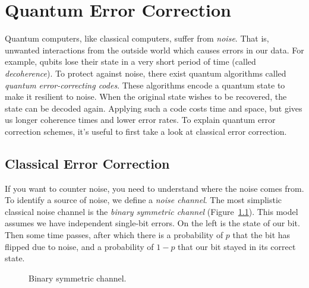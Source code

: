 \chapter{Quantum Error Correction}
Quantum computers, like classical computers, suffer from \emph{noise}. That is, unwanted interactions from the outside world which causes errors in our data. For example, qubits lose their state in a very short period of time (called \emph{decoherence}). To protect against noise, there exist quantum algorithms called \emph{quantum error-correcting codes}. These algorithms encode a quantum state to make it resilient to noise. When the original state wishes to be recovered, the state can be decoded again. Applying such a code costs time and space, but gives us longer coherence times and lower error rates. To explain quantum error correction schemes, it's useful to first take a look at classical error correction.

\section{Classical Error Correction}
If you want to counter noise, you need to understand where the noise comes from. To identify a source of noise, we define a \emph{noise channel}. The most simplistic classical noise channel is the \emph{binary symmetric channel} (Figure~\ref{fig:binary_symmetric_channel}). This model assumes we have independent single-bit errors. On the left is the state of our bit. Then some time passes, after which there is a probability of $p$ that the bit has flipped due to noise, and a probability of $1 - p$ that our bit stayed in its correct state.
\begin{figure}[ht]
  \centering
  \caption{Binary symmetric channel.}
  \label{fig:binary_symmetric_channel}
\end{figure}

